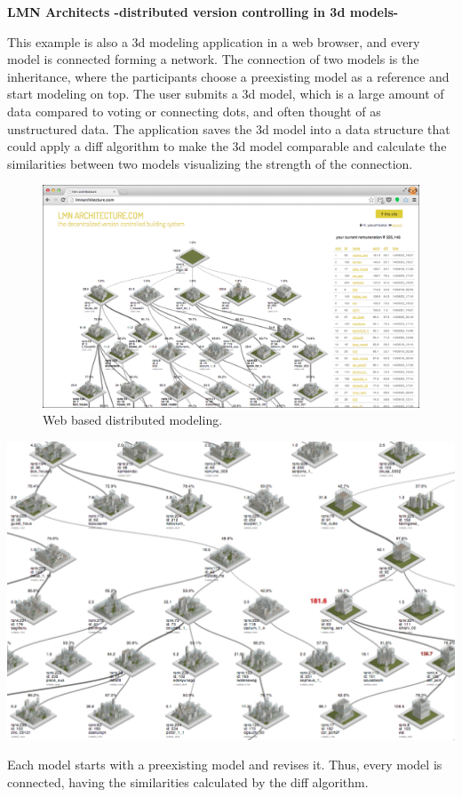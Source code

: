 \textbf{LMN Architects -distributed version controlling in 3d
models-}

This example is also a 3d modeling application in a web browser, and every model is connected forming a network. The connection of two models is the inheritance, where the participants choose a preexisting model as a reference and start modeling on top.  The user submits a 3d model, which is a large amount of data compared to voting or connecting dots, and often thought of as unstructured data. The application saves the 3d model into a data structure that could apply a diff algorithm to make the 3d model comparable and calculate the similarities between two models visualizing the strength of the connection.

\begin{figure}[htb]
  \includegraphics[width=\textwidth]{chapters/3/fig/lmn_004.png}               
  \caption[LMN:web based distributed modelling]{Web based distributed modeling.}
  \label{fig:lnm}
\end{figure}

\begin{marginfigure}[{0cm}]
  \includegraphics[width=\textwidth]{chapters/3/fig/lmn_000.png}               
  \caption[LMN:net work of models]{Each model starts with a preexisting model and revises it.
Thus, every model is connected, having the similarities calculated by the diff algorithm.}
  \label{fig:lnm_zoom}
\end{marginfigure}

